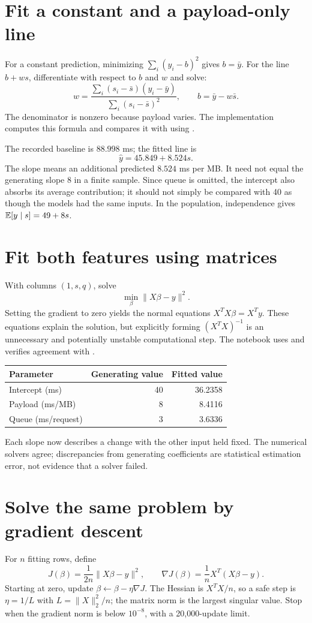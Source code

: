 \section{Fit a constant and a payload-only line}
For a constant prediction, minimizing $\sum_i(y_i-b)^2$ gives $b=\bar y$.
For the line $b+ws$, differentiate with respect to $b$ and $w$ and solve:
\[
w=\frac{\sum_i(s_i-\bar s)(y_i-\bar y)}{\sum_i(s_i-\bar s)^2},
\qquad b=\bar y-w\bar s.
\]
The denominator is nonzero because payload varies. The implementation computes this formula and compares it with  using .

The recorded baseline is $88.998$ ms; the fitted line is
\[\hat y=45.849+8.524s.\]
The slope means an additional predicted $8.524$ ms per MB. It need not equal the generating slope 8 in a finite sample. Since queue is omitted, the intercept also absorbs its average contribution; it should not simply be compared with 40 as though the models had the same inputs. In the population, independence gives $\mathbb{E}[y\mid s]=49+8s$.

\section{Fit both features using matrices}
With columns $(1,s,q)$, solve
\[\min_\beta\|X\beta-y\|^2.\]
Setting the gradient to zero yields the normal equations $X^TX\beta=X^Ty$.
These equations explain the solution, but explicitly forming $(X^TX)^{-1}$ is an unnecessary and potentially unstable computational step. The notebook uses  and verifies agreement with .
\begin{center}
\begin{tabular}{lrr}\toprule
Parameter & Generating value & Fitted value\\\midrule
Intercept (ms) &40&36.2358\\
Payload (ms/MB)&8&8.4116\\
Queue (ms/request)&3&3.6336\\\bottomrule
\end{tabular}
\end{center}
Each slope now describes a change with the other input held fixed. The numerical solvers agree; discrepancies from generating coefficients are statistical estimation error, not evidence that a solver failed.

\section{Solve the same problem by gradient descent}
For $n$ fitting rows, define
\[
J(\beta)=\frac{1}{2n}\|X\beta-y\|^2,\qquad
\nabla J(\beta)=\frac1nX^T(X\beta-y).
\]
Starting at zero, update $\beta\leftarrow\beta-\eta\nabla J$. The Hessian is $X^TX/n$, so a safe step is $\eta=1/L$ with $L=\|X\|_2^2/n$; the matrix norm is the largest singular value. Stop when the gradient norm is below $10^{-8}$, with a 20,000-update limit.


